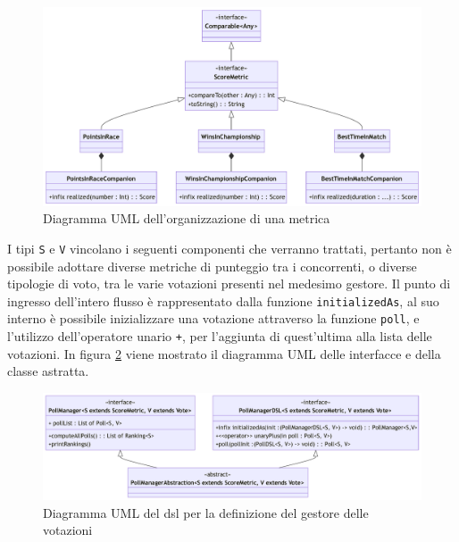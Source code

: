 \documentclass[12pt,a4paper,openright,twoside]{book}
\begin{document}
\vfill
\begin{center} 
\begin{figure}[H]
    \centering
     \includegraphics[width=1.1\linewidth]{figures/scoremetric.pdf}
     \caption{Diagramma UML dell'organizzazione di una metrica}
    \label{fig:metrica}
 \end{figure}
\end{center}
\vfill

I tipi \texttt{S} e \texttt{V} vincolano i seguenti componenti che verranno trattati, pertanto non è possibile adottare diverse metriche di punteggio tra i concorrenti,
o diverse tipologie di voto, tra le varie votazioni presenti nel medesimo gestore.
Il punto di ingresso dell'intero flusso è rappresentato dalla funzione \texttt{initializedAs}, al suo interno è possibile inizializzare una votazione attraverso 
la funzione \texttt{poll}, e l'utilizzo dell'operatore unario \texttt{+}, per l'aggiunta di quest'ultima alla lista delle votazioni.
In figura \ref{fig:pollManagerDSL} viene mostrato il diagramma UML delle interfacce e della classe astratta.
\vfill
\begin{center} 
\begin{figure}[H]
    \centering
     \includegraphics[width=1.1\linewidth]{figures/pollManagerDSL.pdf}
     \caption{Diagramma UML del \ac{dsl} per la definizione del gestore delle votazioni}
    \label{fig:pollManagerDSL}
 \end{figure}
\end{center}
\vfill
 \newpage
\end{document}
